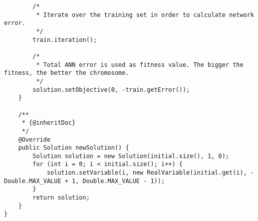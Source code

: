 \begin{verbatim}
        /*
         * Iterate over the training set in order to calculate network error.
         */
        train.iteration();

        /*
         * Total ANN error is used as fitness value. The bigger the fitness, the better the chromosome.
         */
        solution.setObjective(0, -train.getError());
    }

    /**
     * {@inheritDoc}
     */
    @Override
    public Solution newSolution() {
        Solution solution = new Solution(initial.size(), 1, 0);
        for (int i = 0; i < initial.size(); i++) {
            solution.setVariable(i, new RealVariable(initial.get(i), -Double.MAX_VALUE + 1, Double.MAX_VALUE - 1));
        }
        return solution;
    }
}
\end{verbatim}
